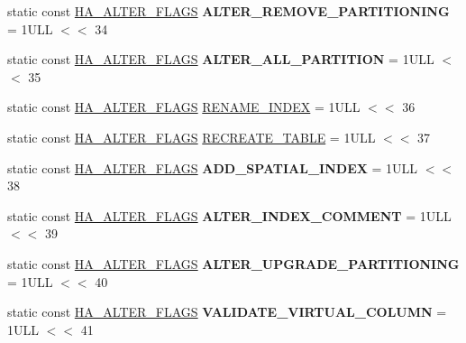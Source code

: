 \begin{DoxyCompactItemize}
static const \mbox{\hyperlink{classAlter__inplace__info_a45258f36b4942b5cabee7239463daaca}{H\+A\+\_\+\+A\+L\+T\+E\+R\+\_\+\+F\+L\+A\+GS}} {\bfseries A\+L\+T\+E\+R\+\_\+\+R\+E\+M\+O\+V\+E\+\_\+\+P\+A\+R\+T\+I\+T\+I\+O\+N\+I\+NG} = 1\+U\+L\+L $<$$<$ 34
\item 
\mbox{\label{classAlter__inplace__info_afd9c30ba36e1f2962f124b2ee52474b2}} 
static const \mbox{\hyperlink{classAlter__inplace__info_a45258f36b4942b5cabee7239463daaca}{H\+A\+\_\+\+A\+L\+T\+E\+R\+\_\+\+F\+L\+A\+GS}} {\bfseries A\+L\+T\+E\+R\+\_\+\+A\+L\+L\+\_\+\+P\+A\+R\+T\+I\+T\+I\+ON} = 1\+U\+L\+L $<$$<$ 35
\item 
static const \mbox{\hyperlink{classAlter__inplace__info_a45258f36b4942b5cabee7239463daaca}{H\+A\+\_\+\+A\+L\+T\+E\+R\+\_\+\+F\+L\+A\+GS}} \mbox{\hyperlink{classAlter__inplace__info_ac6e4d8e123abd811e1bc0fed6de44baf}{R\+E\+N\+A\+M\+E\+\_\+\+I\+N\+D\+EX}} = 1\+U\+L\+L $<$$<$ 36
\item 
static const \mbox{\hyperlink{classAlter__inplace__info_a45258f36b4942b5cabee7239463daaca}{H\+A\+\_\+\+A\+L\+T\+E\+R\+\_\+\+F\+L\+A\+GS}} \mbox{\hyperlink{classAlter__inplace__info_a30dd1964ce7046dee60a5b9284cdfe0b}{R\+E\+C\+R\+E\+A\+T\+E\+\_\+\+T\+A\+B\+LE}} = 1\+U\+L\+L $<$$<$ 37
\item 
\mbox{\label{classAlter__inplace__info_a2c5cf87998f955aaebd6f2aec97860e1}} 
static const \mbox{\hyperlink{classAlter__inplace__info_a45258f36b4942b5cabee7239463daaca}{H\+A\+\_\+\+A\+L\+T\+E\+R\+\_\+\+F\+L\+A\+GS}} {\bfseries A\+D\+D\+\_\+\+S\+P\+A\+T\+I\+A\+L\+\_\+\+I\+N\+D\+EX} = 1\+U\+L\+L $<$$<$ 38
\item 
\mbox{\label{classAlter__inplace__info_a6392309c2e372836fd117416b334a878}} 
static const \mbox{\hyperlink{classAlter__inplace__info_a45258f36b4942b5cabee7239463daaca}{H\+A\+\_\+\+A\+L\+T\+E\+R\+\_\+\+F\+L\+A\+GS}} {\bfseries A\+L\+T\+E\+R\+\_\+\+I\+N\+D\+E\+X\+\_\+\+C\+O\+M\+M\+E\+NT} = 1\+U\+L\+L $<$$<$ 39
\item 
\mbox{\label{classAlter__inplace__info_a4491e95fc4d9fb2336b8aef558a71171}} 
static const \mbox{\hyperlink{classAlter__inplace__info_a45258f36b4942b5cabee7239463daaca}{H\+A\+\_\+\+A\+L\+T\+E\+R\+\_\+\+F\+L\+A\+GS}} {\bfseries A\+L\+T\+E\+R\+\_\+\+U\+P\+G\+R\+A\+D\+E\+\_\+\+P\+A\+R\+T\+I\+T\+I\+O\+N\+I\+NG} = 1\+U\+L\+L $<$$<$ 40
\item 
\mbox{\label{classAlter__inplace__info_a2788baed5f23124c3eeb996d089f99b1}} 
static const \mbox{\hyperlink{classAlter__inplace__info_a45258f36b4942b5cabee7239463daaca}{H\+A\+\_\+\+A\+L\+T\+E\+R\+\_\+\+F\+L\+A\+GS}} {\bfseries V\+A\+L\+I\+D\+A\+T\+E\+\_\+\+V\+I\+R\+T\+U\+A\+L\+\_\+\+C\+O\+L\+U\+MN} = 1\+U\+L\+L $<$$<$ 41
\end{DoxyCompactItemize}


